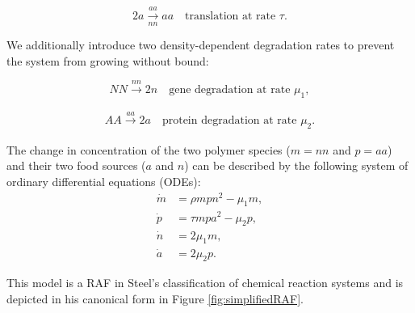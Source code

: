 \documentclass{article}
\begin{document}
\begin{equation}
2a \xrightarrow[nn]{aa} aa\quad \text{translation at rate } \tau.
\label{eq:simplifiedTranslation}
\end{equation}

We additionally introduce two density-dependent degradation rates to prevent the system from growing without bound:

\begin{equation}
NN \xrightarrow[]{nn} 2n\quad \text{gene degradation at rate } \mu_1,
\label{eq:simplifiedRep}
\end{equation}

\begin{equation}
AA \xrightarrow[]{aa} 2a\quad \text{protein degradation at rate } \mu_2.
\label{eq:simplifiedTranslation}
\end{equation}

The change in concentration of the two polymer species ($m=nn$ and $p=aa$) and their two food sources ($a$ and $n$) can be described by the following system of ordinary differential equations (ODEs):
\begin{align}
\dot{m} &= \rho mpn^2 - \mu_1 m, \\
\dot{p} &= \tau mpa^2 - \mu_2 p, \\
\dot{n} &= 2\mu_1m,\\
\dot{a} &= 2\mu_2p.
\end{align}

This model is a RAF in Steel's classification of chemical reaction systems and is depicted in his canonical form in Figure \ref{fig:simplifiedRAF}.
\end{document}
